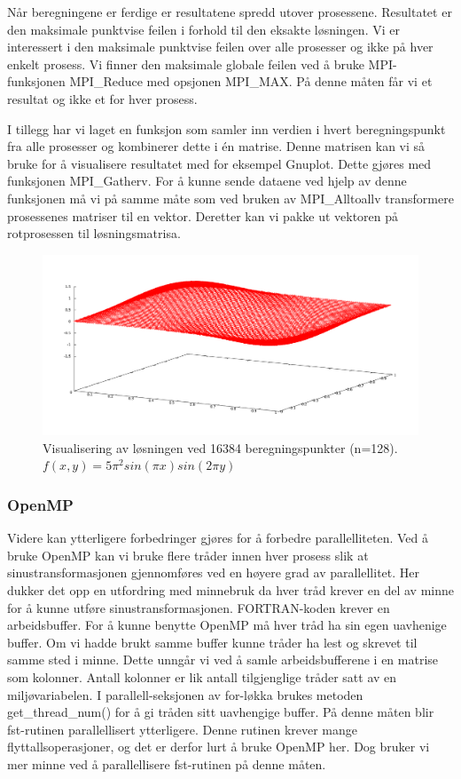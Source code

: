 \documentclass[11pt,norsk,a4paper]{article}
\begin{document}
Når beregningene er ferdige er resultatene spredd utover prosessene. Resultatet er den maksimale punktvise feilen i forhold til den eksakte løsningen. Vi er interessert i den maksimale punktvise feilen over alle prosesser og ikke på hver enkelt prosess. Vi finner den maksimale globale feilen ved å bruke MPI-funksjonen MPI\_Reduce med opsjonen MPI\_MAX. På denne måten får vi et resultat og ikke et for hver prosess.

I tillegg har vi laget en funksjon som samler inn verdien i hvert beregningspunkt fra alle prosesser og kombinerer dette i én matrise. Denne matrisen kan vi så bruke for å visualisere resultatet med for eksempel Gnuplot\cite{gnuplot}. Dette gjøres med funksjonen MPI\_Gatherv. For å kunne sende dataene ved hjelp av denne funksjonen må vi på samme måte som ved bruken av MPI\_Alltoallv transformere prosessenes matriser til en vektor. Deretter kan vi pakke ut vektoren på rotprosessen til løsningsmatrisa.

\begin{figure}[h]
\centering
\includegraphics[scale=0.25]{plot_n128.png}
\caption{Visualisering av løsningen ved 16384 beregningspunkter (n=128). $f(x,y)=5\pi^2sin(\pi x)sin(2\pi y)$}
\end{figure}

\subsubsection{OpenMP}
Videre kan ytterligere forbedringer gjøres for å forbedre parallelliteten. Ved å bruke OpenMP\cite{MP} kan vi bruke flere tråder innen hver prosess slik at sinustransformasjonen gjennomføres ved en høyere grad av parallellitet. Her dukker det opp en utfordring med minnebruk da hver tråd krever en del av minne for å kunne utføre sinustransformasjonen. FORTRAN-koden krever en arbeidsbuffer. For å kunne benytte OpenMP må hver tråd ha sin egen uavhenige buffer. Om vi hadde brukt samme buffer kunne tråder ha lest og skrevet til samme sted i minne. Dette unngår vi ved å samle arbeidsbufferene i en matrise som kolonner. Antall kolonner er lik antall tilgjenglige tråder satt av en miljøvariabelen. I parallell-seksjonen av for-løkka brukes metoden get\_thread\_num() for å gi tråden sitt uavhengige buffer. På denne måten blir fst-rutinen parallellisert ytterligere. Denne rutinen krever mange flyttallsoperasjoner, og det er derfor lurt å bruke OpenMP her. Dog bruker vi mer minne ved å parallellisere fst-rutinen på denne måten.
\end{document}
